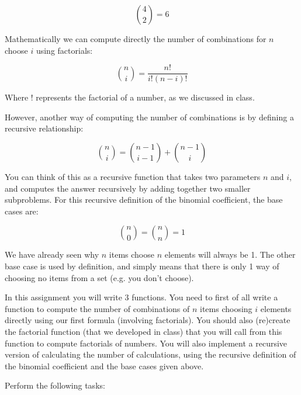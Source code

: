 \documentclass[11pt]{article}
\begin{document}
$$
{4 \choose 2} = 6
$$

Mathematically we can compute directly the number of combinations for
$n$ choose $i$ using factorials:

$$
{n \choose i} = \frac{n!}{i! (n - i)!}
$$

Where $!$ represents the factorial of a number, as we discussed in
class.

However, another way of computing the number of combinations is by
defining a recursive relationship:

$$
{n \choose i} = {n-1 \choose i-1} + {n-1 \choose i}
$$

You can think of this as a recursive function that takes two parameters
$n$ and $i$, and computes the answer recursively by adding together
two smaller subproblems.  For this recursive definition of the
binomial coefficient, the base cases are:

$$
{n \choose 0} = {n \choose n} = 1
$$

We have already seen why $n$ items choose $n$ elements will always
be 1.  The other base case is used by definition, and simply means
that there is only 1 way of choosing no items from a set (e.g. you
don't choose).

In this assignment you will write 3 functions.  You need to first of
all write a function to compute the number of combinations of $n$
items choosing $i$ elements directly using our first formula
(involving factorials).  You should also (re)create the factorial
function (that we developed in class) that you will call from this
function to compute factorials of numbers.  You will also implement a
recursive version of calculating the number of calculations, using the
recursive definition of the binomial coefficient and the base cases
given above.


Perform the following tasks:
\end{document}
